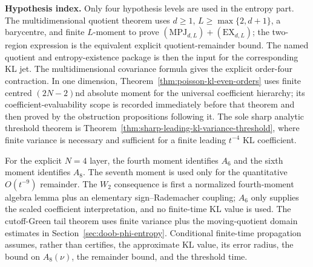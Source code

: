 \medskip
\noindent\textbf{Hypothesis index.}
Only four hypothesis levels are used in the entropy part.  The
multidimensional quotient theorem uses \(d\ge1\), \(L\ge\max\{2,d+1\}\), a
barycentre, and finite \(L\)-moment to prove
\((\mathrm{MPJ}_{d,L})+(\mathrm{EX}_{d,L})\); the two-region expression is the
equivalent explicit quotient-remainder bound.  The named quotient and
entropy-existence package is then the input for the corresponding KL jet.  The
multidimensional covariance formula gives the explicit order-four contraction.
In one dimension,
Theorem~\ref{thm:poisson-kl-even-orders} uses finite centred
\((2N-2)\)nd absolute moment for the universal coefficient hierarchy; its
coefficient-evaluability scope is recorded immediately before that theorem
and then proved by the obstruction propositions following it.  The sole sharp
analytic threshold theorem is
Theorem~\ref{thm:sharp-leading-kl-variance-threshold}, where finite variance
is necessary and sufficient for a finite leading \(t^{-4}\) KL coefficient.

For the explicit \(N=4\) layer, the fourth moment identifies \(A_6\) and the
sixth moment identifies \(A_8\).  The seventh moment is used only for the
quantitative \(O(t^{-9})\) remainder.  The \(W_2\) consequence is first a
normalized fourth-moment algebra lemma plus an elementary sign--Rademacher
coupling; \(A_6\) only supplies the scaled coefficient interpretation, and no
finite-time KL value is used.
The cutoff-Green tail theorem uses finite variance plus the moving-quotient
domain estimates in Section~\ref{sec:doob-phi-entropy}.  Conditional
finite-time propagation assumes, rather than certifies, the approximate KL
value, its error radius, the bound on
\(A_8(\nu)\), the remainder bound, and the threshold time.
